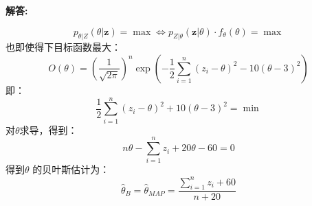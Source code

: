 \documentclass[12pt, onecolumn]{article}
\newcommand\normf{\fangsong}
\newenvironment{solution}{\par\noindent\normf\textbf{解答: }}{\leavevmode\\\par}
\begin{document}
\begin{solution}
\begin{enumerate}
\begin{equation*}
			p_{\theta\vert Z}(\theta\vert \boldsymbol{z})=\max\Leftrightarrow p_{Z\vert \theta}(\boldsymbol{z}\vert\theta )\cdot f_{\theta}(\theta)=\max
			\end{equation*}
			也即使得下目标函数最大：
			\begin{equation*}
			O(\theta)=\left( \frac{1}{\sqrt{2\pi}}\right)^n\exp\left(
			-\frac{1}{2}\sum_{i=1}^{n}(z_i-\theta)^2-10(\theta-3)^2
			\right)  
			\end{equation*}
			即：
			\begin{equation*}
			\frac{1}{2}\sum_{i=1}^{n}(z_i-\theta)^2+10(\theta-3)^2=\min
			\end{equation*}
			对$\theta$求导，得到：
			\begin{equation*}
			n\theta-\sum_{i=1}^{n}z_i+20\theta-60=0
			\end{equation*}
			得到$\theta$ 的贝叶斯估计为：
			\begin{equation*}
			\hat{\theta}_{B}=\hat{\theta}_{MAP}=\frac{\sum_{i=1}^{n}z_i+60}{n+20}
			\end{equation*}
		\end{enumerate}
	\end{solution}
	
\end{document}
